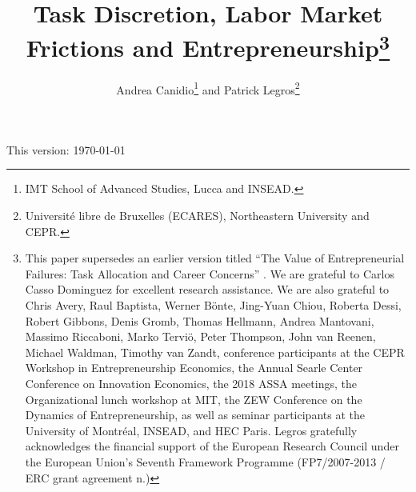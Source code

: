 \documentclass[12pt,american]{paper}
\theoremstyle{remark}
\begin{document}
\title{\vspace*{-3cm} Task Discretion, Labor Market Frictions and Entrepreneurship\footnote{This paper supersedes an earlier version titled ``The Value of Entrepreneurial Failures: Task Allocation and Career Concerns'' \citep{canidio2016}. We are grateful to Carlos Casso Dominguez for excellent research assistance. We are also grateful to Chris Avery, Raul Baptista, Werner B\"onte, Jing-Yuan Chiou, Roberta Dessi, Robert Gibbons, Denis Gromb, Thomas Hellmann, Andrea Mantovani, Massimo Riccaboni, Marko Tervi\"o, Peter Thompson, John van Reenen, Michael Waldman, Timothy van Zandt,  conference participants at the CEPR Workshop in Entrepreneurship Economics,  the Annual Searle Center Conference on Innovation Economics,  the 2018 ASSA meetings, the Organizational lunch workshop at MIT, the ZEW Conference on the Dynamics of Entrepreneurship, as well as seminar participants at the University of Montr\'eal, INSEAD, and HEC Paris. 
Legros gratefully acknowledges the financial support of the European Research Council under the European Union's Seventh Framework Programme (FP7/2007-2013 / ERC grant agreement n.)}
}
\author{Andrea Canidio\thanks{IMT School of Advanced Studies, Lucca and INSEAD.}  and Patrick Legros\thanks{Universit\'e libre de Bruxelles (ECARES), Northeastern University and CEPR.}}

\maketitle 

\noindent This version: \today
\end{document}
